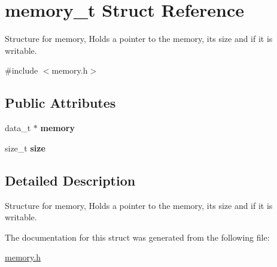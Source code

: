 \hypertarget{structmemory__t}{}\section{memory\+\_\+t Struct Reference}
\label{structmemory__t}


Structure for memory, Holds a pointer to the memory, its size and if it is writable.  




{\ttfamily \#include $<$memory.\+h$>$}

\subsection*{Public Attributes}
\begin{DoxyCompactItemize}
\item 
\mbox{\label{structmemory__t_a87dd3faaa8fbe09a3b36cd43c709d525}} 
data\+\_\+t $\ast$ {\bfseries memory}
\item 
\mbox{\label{structmemory__t_af339b99a47344bb97ad0875d9eccf187}} 
size\+\_\+t {\bfseries size}
\end{DoxyCompactItemize}


\subsection{Detailed Description}
Structure for memory, Holds a pointer to the memory, its size and if it is writable. 

The documentation for this struct was generated from the following file\+:\begin{DoxyCompactItemize}
\item 
\hyperlink{memory_8h}{memory.\+h}\end{DoxyCompactItemize}
